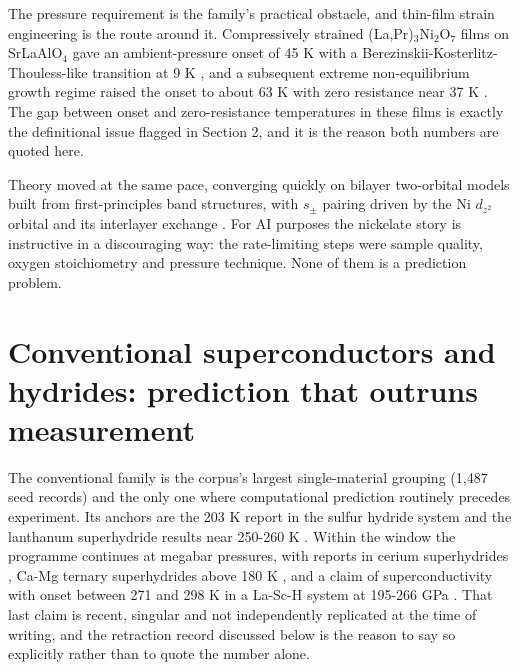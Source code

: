 \documentclass[
  11pt,
]{article}
\begin{document}
The pressure requirement is the family's practical obstacle, and
thin-film strain engineering is the route around it. Compressively
strained (La,Pr)\(_3\)Ni\(_2\)O\(_7\) films on SrLaAlO\(_4\) gave an
ambient-pressure onset of 45 K with a
Berezinskii-Kosterlitz-Thouless-like transition at 9 K
\citep{zhou2024ambient}, and a subsequent extreme non-equilibrium growth
regime raised the onset to about 63 K with zero resistance near 37 K
\citep{zhou2025superconductivity}. The gap between onset and
zero-resistance temperatures in these films is exactly the definitional
issue flagged in Section 2, and it is the reason both numbers are quoted
here.

Theory moved at the same pace, converging quickly on bilayer two-orbital
models built from first-principles band structures, with \(s_\pm\)
pairing driven by the Ni \(d_{z^2}\) orbital and its interlayer exchange
\citep{gu2023effective, luo2023bilayer, sakakibara2023possible, shen2023effective}.
For AI purposes the nickelate story is instructive in a discouraging
way: the rate-limiting steps were sample quality, oxygen stoichiometry
and pressure technique. None of them is a prediction problem.

\section{Conventional superconductors and hydrides: prediction that
outruns
measurement}\label{conventional-superconductors-and-hydrides-prediction-that-outruns-measurement}

The conventional family is the corpus's largest single-material grouping
(1,487 seed records) and the only one where computational prediction
routinely precedes experiment. Its anchors are the 203 K report in the
sulfur hydride system \citep{drozdov2015conventional} and the lanthanum
superhydride results near 250-260 K
\citep{drozdov2019superconductivity, somayazulu2019evidence}. Within the
window the programme continues at megabar pressures, with reports in
cerium superhydrides \citep{semenok2023evidence, cao2024probing}, Ca-Mg
ternary superhydrides above 180 K \citep{cai2023superconductivity}, and
a claim of superconductivity with onset between 271 and 298 K in a
La-Sc-H system at 195-266 GPa \citep{song2025room}. That last claim is
recent, singular and not independently replicated at the time of
writing, and the retraction record discussed below is the reason to say
so explicitly rather than to quote the number alone.
\end{document}
